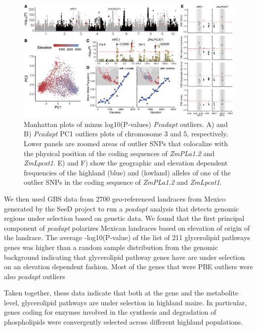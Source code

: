 \documentclass[9pt,twocolumn,twoside,lineno]{gsajnl}
\begin{document}
\begin{figure}[!ht]
\begin{center}
\includegraphics[width=0.4\paperwidth]{Figures/Fig_2.png}
\caption{Manhattan plots of minus log10(P‐values) \textit{Pcadapt} outliers. A) and B) \textit{Pcadapt} PC1 outliers plots of chromosome 3 and 5, respectively. 
Lower panels are zoomed areas of outlier SNPs that colocalize with the physical position of the coding sequences of \textit{ZmPLa1.2} and \textit{ZmLpcat1}. E) and F) show the geographic and elevation dependent frequencies of the highland (blue) and (lowland) alleles of one of the outlier SNPs in the coding sequence of \textit{ZmPLa1.2} and \textit{ZmLpcat1}. 
}
\label{pcadapt}
\end{center}
\end{figure} 

We then used GBS data from 2700 geo-referenced landraces from Mexico generated by the SeeD project \citep{Romero_Navarro2017-cn, Gates2019-we} to run a \textit{pcadapt} analysis that detects genomic regions under selection based on genetic data. We found that the first principal component of \textit{pcadapt} polarizes Mexican landraces based on elevation of origin of the landrace. 
The average -log10(P‐value) of the list of 211 glycerolipid pathways genes was higher than a random sample distribution from the genomic background indicating that glycerolipid pathway genes have are under selection on an elevation dependent fashion. Most of the genes that were PBE outliers were also \textit{pcadapt} outliers    

Taken together, these data indicate that both at the gene and the metabolite level, glycerolipid pathways are under selection in highland maize. 
In particular, genes coding for enzymes involved in the synthesis and degradation of phospholipids were convergently selected across different highland populations. 
\end{document}
